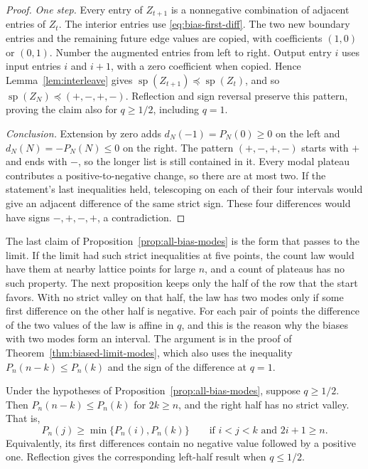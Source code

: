 \begin{proof}
\emph{One step.} Every entry of $Z_{t+1}$ is a nonnegative combination of adjacent entries
of $Z_t$. The interior entries use \eqref{eq:bias-first-diff}. The two new
boundary entries and the remaining future edge values are copied,
with coefficients $(1,0)$ or $(0,1)$. Number the augmented entries from left to
right. Output entry $i$ uses input entries $i$ and $i+1$, with a zero
coefficient when copied. Hence Lemma~\ref{lem:interleave} gives
$\operatorname{sp}(Z_{t+1})\preceq\operatorname{sp}(Z_t)$, and so
$\operatorname{sp}(Z_N)\preceq(+,-,+,-)$. Reflection and sign
reversal preserve this pattern, proving the claim also for $q\ge1/2$,
including $q=1$.

\emph{Conclusion.} Extension by zero adds $d_N(-1)=P_N(0)\ge0$ on the left and $d_N(N)=-P_N(N)\le0$ on the right. The pattern $(+,-,+,-)$ starts with $+$ and ends with $-$, so the
longer list is still contained in it.
Every modal plateau contributes a positive-to-negative change, so there
are at most two. If the statement's last inequalities held, telescoping
on each of their four intervals would give an adjacent difference
of the same strict sign. These four differences would
have signs $-,+,-,+$, a contradiction.
\end{proof}

The last claim of Proposition~\ref{prop:all-bias-modes} is the form
that passes to the limit. If the limit had such strict inequalities at
five points, the count law would have them at nearby lattice points
for large $n$, and a count of plateaus has no such property. The next proposition keeps only the half of the row that the
start favors. With no strict valley on that half, the law has two modes
only if some first difference on the other half is negative. For each
pair of points the difference of the two values of the law is affine
in $q$, and this is the reason why the biases with two modes form an
interval. The argument is in the proof of
Theorem~\ref{thm:biased-limit-modes}, which also uses the inequality
$P_n(n-k)\le P_n(k)$ and the sign of the difference at $q=1$.

\begin{proposition}\label{prop:dominant-half}
Under the hypotheses of Proposition~\ref{prop:all-bias-modes}, suppose
$q\ge1/2$. Then $P_n(n-k)\le P_n(k)$ for $2k\ge n$, and the right half has
no strict valley. That is,
\[
 P_n(j)\ge\min\{P_n(i),P_n(k)\}
 \qquad\text{if }i<j<k\text{ and }2i+1\ge n.
\]
Equivalently, its first differences contain no negative value followed
by a positive one. Reflection gives the corresponding left-half result
when $q\le1/2$.
\end{proposition}

